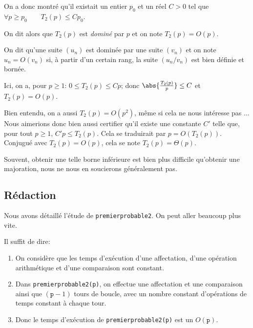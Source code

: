 
On a donc montré qu'il existait un entier $p_{0}$ et un réel $C>0$ tel que
$  \forall p\geq p_0 \qquad T_{2}(p)\leq Cp_0$.

On dit alors que $T_{2}(p)$ est \emph{dominé} par $p$ et on note
$  T_{2}(p) = O(p)$.

\begin{defi}{}
  On dit qu'une suite $(u_{n})$ est dominée par une suite $(v_{n})$ et
  on note $u_{n} = O(v_{n})$ si,  à partir d'un certain rang, la suite
  $(u_{n}/v_{n})$ est bien définie et bornée.  
\end{defi}

Ici, on a, pour $p\geq 1$: $0 \leq T_{2}(p) \leq C p$; donc $ \abs{\frac{T_{2}(p)}{p}} \leq C$ et $T_{2}(p)=O(p)$.

\begin{rem}
  Bien entendu, on a aussi $T_2(p) = O(p^2)$, même si cela ne nous intéresse pas ... Nous aimerions donc bien aussi certifier qu'il existe une constante $C'$ telle que, pour tout $p\geq 1$, $C'p \leq T_2(p)$. 
  Cela se traduirait par $p = O(T_2(p))$. Conjugué avec $T_2(p) = O(p)$, cela se note $T_2(p) =\Theta(p)$. 
  
  Souvent, obtenir une telle borne inférieure est bien plus difficile qu'obtenir une majoration, nous ne nous en soucierons généralement pas. 
\end{rem}


\subsection{Rédaction}
Nous avons détaillé l'étude de \texttt{premierprobable2}. On peut aller
beaucoup plus vite.

Il suffit de dire:

\begin{enumerate}
\item On considère que les temps d'exécution d'une affectation, d'une
  opération arithmétique et d'une comparaison sont constant.
\item Dans \texttt{premierprobable2(p)}, on effectue une affectation et
  une comparaison ainsi que $(\texttt{p}-1)$ tours de boucle, avec un
  nombre constant d'opérations de temps constant à chaque tour.
\item Donc le temps d'exécution de \texttt{premierprobable2(p)} est un
  $O(\texttt{p})$.
\end{enumerate}

